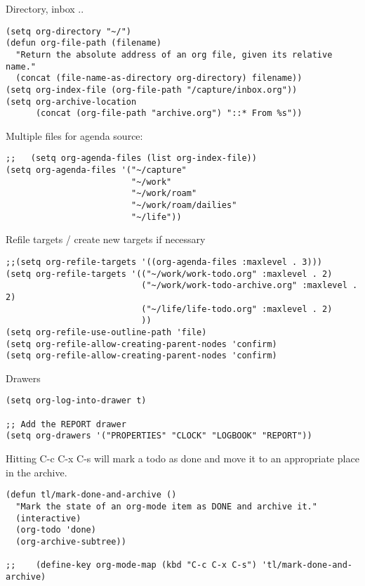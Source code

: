 \documentclass[12pt]{article}
\begin{document}
Directory, inbox ..

\begin{verbatim}
(setq org-directory "~/")
(defun org-file-path (filename)
  "Return the absolute address of an org file, given its relative name."
  (concat (file-name-as-directory org-directory) filename))
(setq org-index-file (org-file-path "/capture/inbox.org"))
(setq org-archive-location
      (concat (org-file-path "archive.org") "::* From %s"))
\end{verbatim}

Multiple files for agenda source:

\begin{verbatim}
;;   (setq org-agenda-files (list org-index-file))
(setq org-agenda-files '("~/capture"
                         "~/work"
                         "~/work/roam"
                         "~/work/roam/dailies"
                         "~/life"))
\end{verbatim}

Refile targets / create new targets if necessary

\begin{verbatim}
;;(setq org-refile-targets '((org-agenda-files :maxlevel . 3)))
(setq org-refile-targets '(("~/work/work-todo.org" :maxlevel . 2)
                           ("~/work/work-todo-archive.org" :maxlevel . 2)
                           ("~/life/life-todo.org" :maxlevel . 2)
                           ))
(setq org-refile-use-outline-path 'file)
(setq org-refile-allow-creating-parent-nodes 'confirm)
(setq org-refile-allow-creating-parent-nodes 'confirm)
\end{verbatim}

Drawers 
\begin{verbatim}
(setq org-log-into-drawer t)

;; Add the REPORT drawer
(setq org-drawers '("PROPERTIES" "CLOCK" "LOGBOOK" "REPORT"))
\end{verbatim}

Hitting C-c C-x C-s will mark a todo as done and move it to an appropriate place
in the archive.

\begin{verbatim}
(defun tl/mark-done-and-archive ()
  "Mark the state of an org-mode item as DONE and archive it."
  (interactive)
  (org-todo 'done)
  (org-archive-subtree))

;;    (define-key org-mode-map (kbd "C-c C-x C-s") 'tl/mark-done-and-archive)



\end{verbatim}
\end{document}
